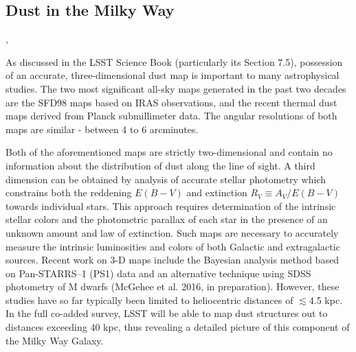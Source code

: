 %
%

\subsection{Dust in the Milky Way}
\def\secname{MW_Dust}\label{sec:\secname}

,

As discussed in the LSST Science Book (particularly its Section 7.5),
possession of an accurate, three-dimensional dust map is important to
many astrophysical studies. The two most significant all-sky maps
generated in the past two decades are the SFD98 maps based on IRAS
observations, and the recent thermal dust maps derived from Planck
submillimeter data. The angular resolutions of both maps are similar -
between 4 to 6 arcminutes.

Both of the aforementioned maps are strictly two-dimensional and contain
no information about the distribution of dust along the line of sight. A
third dimension can be obtained by analysis of accurate stellar
photometry which constrains both the reddening $E(B-V)$ and extinction
$R_V \equiv A_V/E(B-V)$ towards individual stars. This approach requires
determination of the intrinsic stellar colors and the photometric
parallax of each star in the presence of an unknown amount and law of
extinction. Such maps are necessary to accurately measure the intrinsic
luminosities and colors of both Galactic and extragalactic sources.
Recent work on 3-D maps include the Bayesian analysis method based on
Pan-STARRS--1 (PS1) data \citep{green15} and an alternative technique
using SDSS photometry of M dwarfs (McGehee et al. 2016, in preparation).
However, these studies have so far typically been limited to
heliocentric distances of $\lesssim$4.5 kpc. In the full co-added
survey, LSST will be able to map dust structures out to distances
exceeding 40 kpc, thus revealing a detailed picture of this component of
the Milky Way Galaxy.


